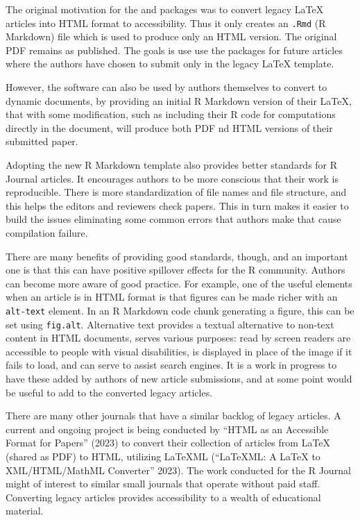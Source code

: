 The original motivation for the  and  packages was to convert legacy LaTeX articles into HTML format to accessibility. Thus it only creates an \texttt{.Rmd} (R Markdown) file which is used to produce only an HTML version. The original PDF remains as published. The goals is use use the packages for future articles where the authors have chosen to submit only in the legacy LaTeX template.

However, the software can also be used by authors themselves to convert to dynamic documents, by providing an initial R Markdown version of their LaTeX, that with some modification, such as including their R code for computations directly in the document, will produce both PDF nd HTML versions of their submitted paper.

Adopting the new R Markdown template also provides better standards for R Journal articles. It encourages authors to be more conscious that their work is reproducible. There is more standardization of file names and file structure, and this helps the editors and reviewers check papers. This in turn makes it easier to build the issues eliminating some common errors that authors make that cause compilation failure.

There are many benefits of providing good standards, though, and an important one is that this can have positive spillover effects for the R community. Authors can become more aware of good practice. For example, one of the useful elements when an article is in HTML format is that figures can be made richer with an \texttt{alt-text} element. In an R Markdown code chunk generating a figure, this can be set using \texttt{fig.alt}. Alternative text provides a textual alternative to non-text content in HTML documents, serves various purposes: read by screen readers are accessible to people with visual disabilities, is displayed in place of the image if it fails to load, and can serve to assist search engines. It is a work in progress to have these added by authors of new article submissions, and at some point would be useful to add to the converted legacy articles.

There are many other journals that have a similar backlog of legacy articles. A current and ongoing project is being conducted by {``HTML as an Accessible Format for Papers''} (2023) to convert their collection of articles from LaTeX (shared as PDF) to HTML, utilizing LaTeXML ({``{LaTeXML}: A {LaTeX} to {XML/HTML/MathML} Converter''} 2023). The work conducted for the R Journal might of interest to similar small journals that operate without paid staff. Converting legacy articles provides accessibility to a wealth of educational material.

